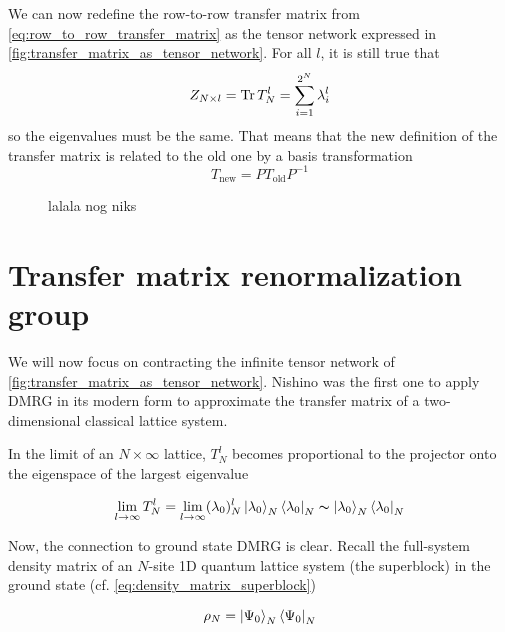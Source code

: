 We can now redefine the row-to-row transfer matrix from
\autoref{eq:row_to_row_transfer_matrix} as the tensor network expressed in
\autoref{fig:transfer_matrix_as_tensor_network}. For all $l$, it is still true that
\begin{equation}
  Z_{N \times l} = \operatorname{Tr} T_{N}^{l} = \sum_{i = 1}^{2^N} \lambda_{i}^{l}
\end{equation}
so the eigenvalues must be the same. That means that the new definition of the transfer
matrix is related to the old one by a basis transformation
\begin{equation}
  T_{\text{new}} = P T_{\text{old}} P^{-1}
\end{equation}



\begin{figure}
  
  \caption{lalala nog niks}
  \label{fig:transfer_matrix_as_tensor_network}
\end{figure}



\section{Transfer matrix renormalization group}

We will now focus on contracting the infinite tensor network of
\autoref{fig:transfer_matrix_as_tensor_network}. Nishino \cite{nishino1995density} was the
first one to apply DMRG in its modern form to approximate the transfer matrix of a
two-dimensional classical lattice system.

In the limit of an $N \times \infty$ lattice, $T_{N}^{l}$ becomes proportional
to the projector onto the eigenspace of the largest eigenvalue

\begin{equation}
  \lim_{l \to \infty} T_{N}^{l} = \lim_{l \to \infty} (\lambda_0)_{N}^{l} \ket{\lambda_0}_{N}\bra{\lambda_0}_{N} \thicksim \ket{\lambda_0}_{N}\bra{\lambda_0}_N
\end{equation}

Now, the connection to ground state DMRG is clear. Recall the full-system
density matrix of an $N$-site 1D quantum lattice system (the superblock) in the
ground state (cf. \eqref{eq:density_matrix_superblock})

\begin{equation}
  \rho_N = \ket{\Psi_0}_{N}\bra{\Psi_0}_{N}
\end{equation}


